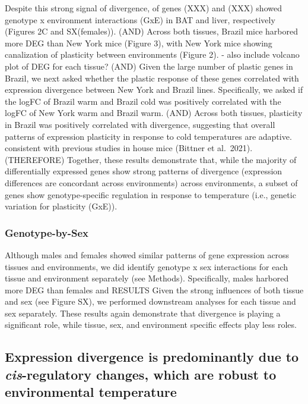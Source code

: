 \documentclass[9pt,twocolumn,twoside,lineno]{pnas-new}
\begin{document}
Despite this strong signal of divergence, of genes (XXX) and (XXX)
showed genotype x environment interactions (GxE) in BAT and liver,
respectively (Figures 2C and SX(females)). (AND) Across both tissues,
Brazil mice harbored more DEG than New York mice (Figure 3), with New
York mice showing canalization of plasticity between environments
(Figure 2). - also include volcano plot of DEG for each tissue? (AND)
Given the large number of plastic genes in Brazil, we next asked whether
the plastic response of these genes correlated with expression
divergence between New York and Brazil lines. Specifically, we asked if
the logFC of Brazil warm and Brazil cold was positively correlated with
the logFC of New York warm and Brazil warm. (AND) Across both tissues,
plasticity in Brazil was positively correlated with divergence,
suggesting that overall patterns of expression plasticity in response to
cold temperatures are adaptive. consistent with previous studies in
house mice (Bittner et al.~2021). (THEREFORE) Together, these results
demonstrate that, while the majority of differentially expressed genes
show strong patterns of divergence (expression differences are
concordant across environments) across environments, a subset of genes
show genotype-specific regulation in response to temperature (i.e.,
genetic variation for plasticity (GxE)).

\hypertarget{genotype-by-sex}{%
\subsubsection{Genotype-by-Sex}\label{genotype-by-sex}}

Although males and females showed similar patterns of gene expression
across tissues and environments, we did identify genotype x sex
interactions for each tissue and environment separately (see Methods).
Specifically, males harbored more DEG than females and RESULTS Given the
strong influences of both tissue and sex (see Figure SX), we performed
downstream analyses for each tissue and sex separately. These results
again demonstrate that divergence is playing a significant role, while
tissue, sex, and environment specific effects play less roles.

\hypertarget{expression-divergence-is-predominantly-due-to-cis-regulatory-changes-which-are-robust-to-environmental-temperature}{%
\subsection*{\texorpdfstring{Expression divergence is predominantly due
to \emph{cis}-regulatory changes, which are robust to environmental
temperature}{Expression divergence is predominantly due to cis-regulatory changes, which are robust to environmental temperature}}\label{expression-divergence-is-predominantly-due-to-cis-regulatory-changes-which-are-robust-to-environmental-temperature}}
\end{document}
